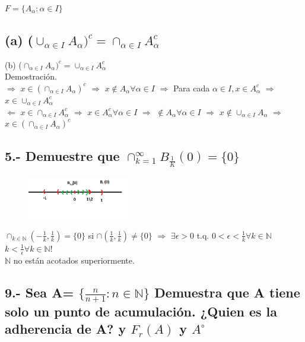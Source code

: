 \documentclass[secnumarabic,balancelastpage,amsmath,amssymb]{article}
\theoremstyle{remark}
\theoremstyle{definition}
\theoremstyle{prop}
\begin{document}
$F= \{A_{\alpha}: \alpha \in I\}$
\subsection*{ (a) ($\cup_{\alpha \in I}A_{\alpha})^{c}= \cap_{\alpha \in I} A_{\alpha}^{c}$}

(b) ($\cap_{\alpha \in I}A_{\alpha})^{c}= \cup_{\alpha \in I} A_{\alpha}^{c}$\\

Demostración.\\
$\Rightarrow$ $x \in (\cap_{\alpha \in I} A_{\alpha})^{c}$ $\Rightarrow$ $x \notin A_{\alpha} \forall \alpha \in I$ 
$\Rightarrow$ Para cada $\alpha \in I, x \in A_{\alpha}^{c}$ $\Rightarrow$ 
$x \in \cup_{\alpha \in I} A_{\alpha}^{c}$\\
$\Leftarrow$ $x \in \cap_{\alpha \in I} A_{\alpha}^{c}$ $\Rightarrow$ $x \in A_{\alpha}^{c} \forall \alpha \in I$ $\Rightarrow$ $\notin A_{\alpha} \forall \alpha \in I$ $\Rightarrow$ $x \notin \cup_{\alpha \in I} A_{\alpha}$
$\Rightarrow$ $x \in (\cap_{\alpha \in I} A_{\alpha})^{c}$\\

\subsection*{5.- Demuestre que $\cap_{k=1}^{\infty} B_{\frac{1}{K}}(0)=\{0\}$}

\begin{figure}[h!]
\centering
\includegraphics[width=0.4\textwidth]{5.PNG}
\label{fig:fig5.}
\end{figure}

$\cap_{k \in \mathbb {N} } (-\frac{1}{k},\frac{1}{k})= \{0\}$ si $\cap(\frac{1}{k},\frac{1}{k}) \not= \{0\}$ $\Rightarrow$ $\exists \epsilon >0$ t.q. $0<\epsilon< \frac{1}{k} \forall k \in \mathbb{N}$\\
$k< \frac{1}{\epsilon} \forall k \in \mathbb{N}!$\\
$\mathbb{N}$ no están acotados superiormente.\\

\subsection*{9.- Sea A= $\{ \frac{n}{n+1}: n \in \mathbb{N} \}$ Demuestra que A tiene solo un punto de acumulación. ¿Quien es la adherencia de A? y $F_{r}(A)$ y $A^{\circ}$}
\end{document}
